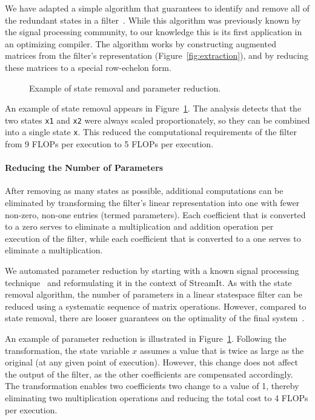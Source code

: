We have adapted a simple algorithm that guarantees to identify and
remove all of the redundant states in a filter~\cite{Mayne}.  While
this algorithm was previously known by the signal processing
community, to our knowledge this is its first application in an
optimizing compiler.  The algorithm works by constructing augmented
matrices from the filter's representation
(Figure~\ref{fig:extraction}), and by reducing these matrices to a
special row-echelon form.

\begin{figure}[t]
\caption{Example of state removal and parameter reduction.\protect\label{fig:states}}
\end{figure}

An example of state removal appears in Figure~\ref{fig:states}.  The
analysis detects that the two states {\tt x1} and {\tt x2} were always
scaled proportionately, so they can be combined into a single state
{\tt x}.  This reduced the computational requirements of the filter
from 9 FLOPs per execution to 5 FLOPs per execution.

\paragraph*{Reducing the Number of Parameters}  After removing as 
many states as possible, additional computations can be eliminated by
transforming the filter's linear representation into one with fewer
non-zero, non-one entries (termed parameters).  Each coefficient that
is converted to a zero serves to eliminate a multiplication and
addition operation per execution of the filter, while each coefficient
that is converted to a one serves to eliminate a multiplication.  

We automated parameter reduction by starting with a known signal
processing technique~\cite{Ackermann/Bucy} and reformulating it in the
context of StreamIt.  As with the state removal algorithm, the number
of parameters in a linear statespace filter can be reduced using a
systematic sequence of matrix operations.  However, compared to state
removal, there are looser guarantees on the optimality of the final
system~\cite{agrawal-cases05}.

An example of parameter reduction is illustrated in
Figure~\ref{fig:states}.  Following the transformation, the state
variable $x$ assumes a value that is twice as large as the original
(at any given point of execution).  However, this change does not
affect the output of the filter, as the other coefficients are
compensated accordingly.  The transformation enables two coefficients
two change to a value of 1, thereby eliminating two multiplication
operations and reducing the total cost to 4 FLOPs per execution.

